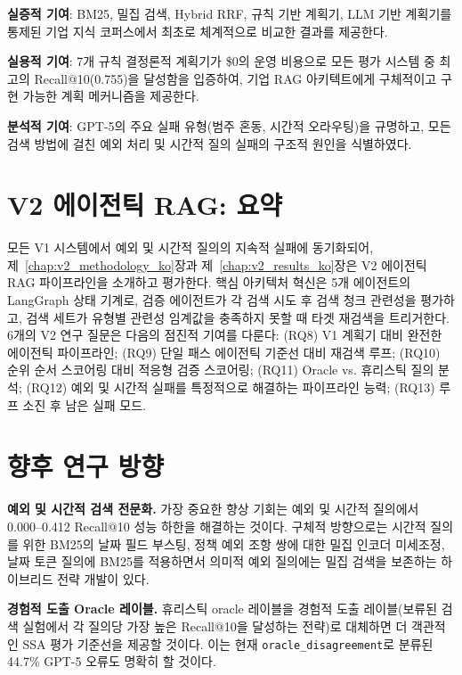 \textbf{실증적 기여}: BM25, 밀집 검색, Hybrid RRF, 규칙 기반 계획기, LLM 기반 계획기를 통제된 기업 지식 코퍼스에서 최초로 체계적으로 비교한 결과를 제공한다.

\textbf{실용적 기여}: 7개 규칙 결정론적 계획기가 \$0의 운영 비용으로 모든 평가 시스템 중 최고의 Recall@10(0.755)을 달성함을 입증하여, 기업 RAG 아키텍트에게 구체적이고 구현 가능한 계획 메커니즘을 제공한다.

\textbf{분석적 기여}: GPT-5의 주요 실패 유형(범주 혼동, 시간적 오라우팅)을 규명하고, 모든 검색 방법에 걸친 예외 처리 및 시간적 질의 실패의 구조적 원인을 식별하였다.

\section{V2 에이전틱 RAG: 요약}
\label{sec:conc_v2_summary_ko}

모든 V1 시스템에서 예외 및 시간적 질의의 지속적 실패에 동기화되어, 제~\ref{chap:v2_methodology_ko}장과 제~\ref{chap:v2_results_ko}장은 V2 에이전틱 RAG 파이프라인을 소개하고 평가한다. 핵심 아키텍처 혁신은 5개 에이전트의 LangGraph 상태 기계로, 검증 에이전트가 각 검색 시도 후 검색 청크 관련성을 평가하고, 검색 세트가 유형별 관련성 임계값을 충족하지 못할 때 타겟 재검색을 트리거한다. 6개의 V2 연구 질문은 다음의 점진적 기여를 다룬다: (RQ8) V1 계획기 대비 완전한 에이전틱 파이프라인; (RQ9) 단일 패스 에이전틱 기준선 대비 재검색 루프; (RQ10) 순위 순서 스코어링 대비 적응형 검증 스코어링; (RQ11) Oracle vs. 휴리스틱 질의 분석; (RQ12) 예외 및 시간적 실패를 특정적으로 해결하는 파이프라인 능력; (RQ13) 루프 소진 후 남은 실패 모드.

\section{향후 연구 방향}
\label{sec:conc_future_ko}

\textbf{예외 및 시간적 검색 전문화.} 가장 중요한 향상 기회는 예외 및 시간적 질의에서 0.000--0.412 Recall@10 성능 하한을 해결하는 것이다. 구체적 방향으로는 시간적 질의를 위한 BM25의 날짜 필드 부스팅, 정책 예외 조항 쌍에 대한 밀집 인코더 미세조정, 날짜 토큰 질의에 BM25를 적용하면서 의미적 예외 질의에는 밀집 검색을 보존하는 하이브리드 전략 개발이 있다.

\textbf{경험적 도출 Oracle 레이블.} 휴리스틱 oracle 레이블을 경험적 도출 레이블(보류된 검색 실험에서 각 질의당 가장 높은 Recall@10을 달성하는 전략)로 대체하면 더 객관적인 SSA 평가 기준선을 제공할 것이다. 이는 현재 \texttt{oracle\_disagreement}로 분류된 44.7\% GPT-5 오류도 명확히 할 것이다.

